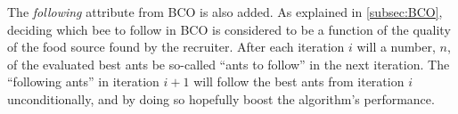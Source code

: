 The \textit{following} attribute from BCO is also added. As explained in \vref{subsec:BCO}, deciding which bee to follow in BCO is considered to be a function of the quality of the food source found by the recruiter. After each iteration $i$ will a number, $n$, of the evaluated best ants be so-called ``ants to follow'' in the next iteration. The ``following ants'' in iteration $i+1$ will follow the best ants from iteration $i$ unconditionally, and by doing so hopefully boost the algorithm's performance.






